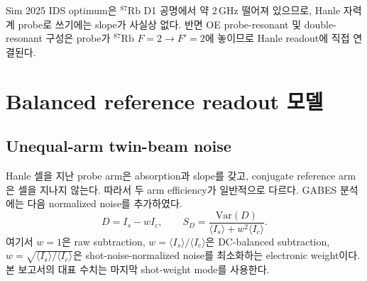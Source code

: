 \documentclass[11pt,a4paper]{article}
\newcommand{\GHz}{\,\mathrm{GHz}}
\newcommand{\Rb}[1]{\({}^{#1}\mathrm{Rb}\)}
\begin{document}
\begin{table}[h]
\centering
\caption{분석에 사용한 source configuration과 \Rb{87} 공명성.}
\label{tab:sourcefreq}
\end{table}

Sim 2025 IDS optimum은 \Rb{87} D1 공명에서 약 \(2\GHz\) 떨어져 있으므로,
Hanle 자력계 probe로 쓰기에는 slope가 사실상 없다. 반면 OE probe-resonant 및
double-resonant 구성은 probe가 \Rb{87} \(F=2\to F'=2\)에 놓이므로 Hanle readout에 직접 연결된다.

\section{Balanced reference readout 모델}

\subsection{Unequal-arm twin-beam noise}

Hanle 셀을 지난 probe arm은 absorption과 slope를 갖고, conjugate reference arm은 셀을 지나지 않는다.
따라서 두 arm efficiency가 일반적으로 다르다. GABES 분석에는 다음 normalized noise를 추가하였다.
\begin{equation}
D = I_s-wI_c,\qquad
S_D = \frac{\mathrm{Var}(D)}{\langle I_s\rangle+w^2\langle I_c\rangle}.
\label{eq:balanced}
\end{equation}
여기서 \(w=1\)은 raw subtraction, \(w=\langle I_s\rangle/\langle I_c\rangle\)은
DC-balanced subtraction, \(w=\sqrt{\langle I_s\rangle/\langle I_c\rangle}\)은
shot-noise-normalized noise를 최소화하는 electronic weight이다. 본 보고서의 대표 수치는
마지막 shot-weight mode를 사용한다.
\end{document}
